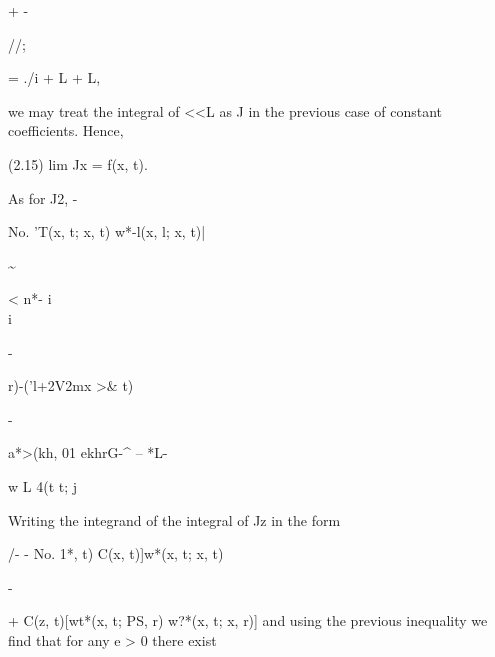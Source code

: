+ -

\begin{ocrformula}
C({, r)<<*'(*, i; i, t) [/(x, t)                           /(kh, t)] <2PS
\end{ocrformula}

//;

\begin{ocrformula}
=    ./i +         L        +        L,
\end{ocrformula}

we may treat the integral of <<L as J in the previous case of constant coefficients. Hence,

\begin{ocrformula}
(2.15)                                            lim Jx = f(x, t).
\end{ocrformula}

As for J2, -

\begin{ocrformula}
No. 'T(x,      t; x, t)          w*-l(x, l; x, t)|
\end{ocrformula}

\textasciitilde{}

\begin{ocrformula}
< n*\x -       i\\i
\end{ocrformula}

-

\begin{ocrformula}
r)-('l+2V2mx               \a*>& t)
\end{ocrformula}

-

\begin{ocrformula}
a*>(kh, 01 ekhrG-^                --   *L-
\end{ocrformula}

w L 4(t t; j

Writing the integrand of the integral of Jz in the form

\begin{ocrformula}
/-                   -
No. 1*,    t)            C(x, t)]w*(x,          t; x, t)
\end{ocrformula}

-

\begin{ocrformula}
+      C(z, t)[wt*(x, t; PS, r)                   w?*(x, t; x, r)]
and  using the previous inequality we find that for any e > 0 there                                                       exist
\end{ocrformula}

